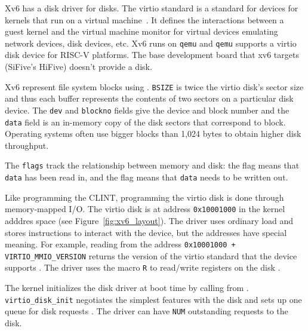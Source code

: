 Xv6 has a disk driver for  disks. The
virtio standard is a standard for devices for kernels that run on a
virtual machine~\cite{virtio}.  It defines the interactions between a guest kernel
and the virtual machine monitor for virtual devices emulating network
devices, disk devices, etc.  Xv6 runs on \texttt{qemu} and
\texttt{qemu} supports a virtio disk device for RISC-V platforms.  The
base development board that xv6 targets (SiFive's HiFive) doesn't
provide a disk.

Xv6 represent file system blocks using
.
\lstinline{BSIZE}
is twice the virtio disk's sector size and thus
each buffer represents the contents of two sectors on a particular
disk device.  The
\lstinline{dev}
and
\lstinline{blockno}
fields give the device and block
number and the
\lstinline{data}
field is an in-memory copy of the disk sectors that correspond to block.
Operating systems often use
bigger blocks than 1,024 bytes to obtain higher disk throughput.

The
\lstinline{flags}
track the relationship between memory and disk:
the
flag means that
\lstinline{data}
has been read in, and
the 
flag means that
\lstinline{data}
needs to be written out.

Like programming the CLINT, programming the virtio disk is done
through memory-mapped I/O.  The virtio disk is at address
\lstinline{0x10001000} in the kernel adddres space (see
Figure~\ref{fig:xv6_layout}).  The driver uses ordinary load and
stores instructions to interact with the device, but the addresses
have special meaning.  For example, reading from the address
\lstinline{0x10001000 + VIRTIO_MMIO_VERSION}
 returns the version of the virtio
standard that the device supports
.  The driver uses the
macro \lstinline{R} to read/write registers on the disk
.

The kernel initializes the disk driver at boot time by calling
 from
 .
\lstinline{virtio_disk_init} negotiates the simplest features with the
disk  and sets
up one queue for disk requests .  The driver can have
\lstinline{NUM} outstanding requests to the disk.

